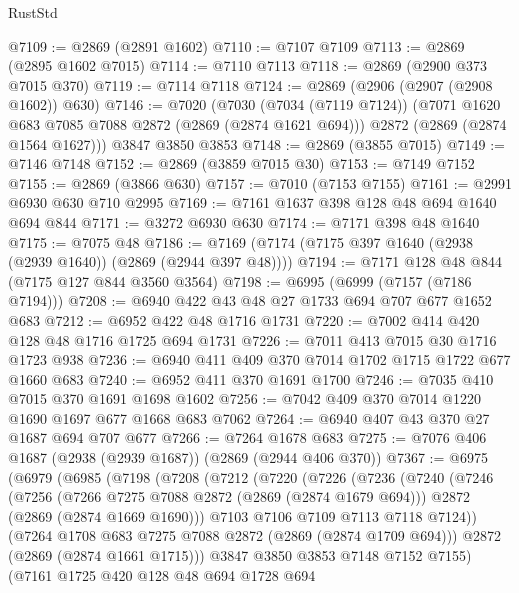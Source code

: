 \begin{lexlean}{RustStd}
\begin{coremodule}
{\begin{coremodule}
{{{{{{{{{{{{@7109 := @2869 (@2891 @1602)
@7110 := @7107 @7109
@7113 := @2869 (@2895 @1602 @7015)
@7114 := @7110 @7113
@7118 := @2869 (@2900 @373 @7015 @370)
@7119 := @7114 @7118
@7124 := @2869 (@2906 (@2907 (@2908 @1602)) @630)
@7146 := @7020
    (@7030
      (@7034 (@7119 @7124))
      (@7071 @1620 @683 @7085 @7088 @2872 (@2869 (@2874 @1621 @694)))
      @2872
      (@2869 (@2874 @1564 @1627)))
    @3847
    @3850
    @3853
@7148 := @2869 (@3855 @7015)
@7149 := @7146 @7148
@7152 := @2869 (@3859 @7015 @30)
@7153 := @7149 @7152
@7155 := @2869 (@3866 @630)
@7157 := @7010 (@7153 @7155)
@7161 := @2991 @6930 @630 @710 @2995
@7169 := @7161 @1637 @398 @128 @48 @694 @1640 @694 @844
@7171 := @3272 @6930 @630
@7174 := @7171 @398 @48 @1640
@7175 := @7075 @48
@7186 := @7169 (@7174 (@7175 @397 @1640 (@2938 (@2939 @1640)) (@2869 (@2944 @397 @48))))
@7194 := @7171 @128 @48 @844 (@7175 @127 @844 @3560 @3564)
@7198 := @6995 (@6999 (@7157 (@7186 @7194)))
@7208 := @6940 @422 @43 @48 @27 @1733 @694 @707 @677 @1652 @683
@7212 := @6952 @422 @48 @1716 @1731
@7220 := @7002 @414 @420 @128 @48 @1716 @1725 @694 @1731
@7226 := @7011 @413 @7015 @30 @1716 @1723 @938
@7236 := @6940 @411 @409 @370 @7014 @1702 @1715 @1722 @677 @1660 @683
@7240 := @6952 @411 @370 @1691 @1700
@7246 := @7035 @410 @7015 @370 @1691 @1698 @1602
@7256 := @7042 @409 @370 @7014 @1220 @1690 @1697 @677 @1668 @683 @7062
@7264 := @6940 @407 @43 @370 @27 @1687 @694 @707 @677
@7266 := @7264 @1678 @683
@7275 := @7076 @406 @1687 (@2938 (@2939 @1687)) (@2869 (@2944 @406 @370))
@7367 := @6975
    (@6979
      (@6985
        (@7198
          (@7208
            (@7212
              (@7220
                (@7226
                  (@7236
                    (@7240
                      (@7246
                        (@7256
                          (@7266 @7275 @7088 @2872 (@2869 (@2874 @1679 @694)))
                          @2872
                          (@2869 (@2874 @1669 @1690)))
                        @7103
                        @7106
                        @7109
                        @7113
                        @7118
                        @7124))
                    (@7264 @1708 @683 @7275 @7088 @2872 (@2869 (@2874 @1709 @694)))
                    @2872
                    (@2869 (@2874 @1661 @1715)))
                  @3847
                  @3850
                  @3853
                  @7148
                  @7152
                  @7155)
                (@7161
                  @1725
                  @420
                  @128
                  @48
                  @694
                  @1728
                  @694
}}}}}}}}}}}}
\end{coremodule}}
\end{coremodule}
\end{lexlean}
